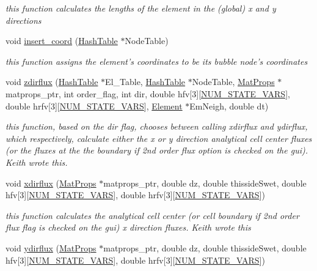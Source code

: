 \begin{CompactItemize}
\begin{CompactList}\small\item\em this function calculates the lengths of the element in the (global) x and y directions \item\end{CompactList}\item 
void \hyperlink{classElement_a74}{insert\_\-coord} (\hyperlink{classHashTable}{Hash\-Table} $\ast$Node\-Table)
\begin{CompactList}\small\item\em this function assigns the element's coordinates to be its bubble node's coordinates \item\end{CompactList}\item 
void \hyperlink{classElement_a75}{zdirflux} (\hyperlink{classHashTable}{Hash\-Table} $\ast$El\_\-Table, \hyperlink{classHashTable}{Hash\-Table} $\ast$Node\-Table, \hyperlink{structMatProps}{Mat\-Props} $\ast$matprops\_\-ptr, int order\_\-flag, int dir, double hfv\mbox{[}3\mbox{]}\mbox{[}\hyperlink{constant_8h_a45}{NUM\_\-STATE\_\-VARS}\mbox{]}, double hrfv\mbox{[}3\mbox{]}\mbox{[}\hyperlink{constant_8h_a45}{NUM\_\-STATE\_\-VARS}\mbox{]}, \hyperlink{classElement}{Element} $\ast$Em\-Neigh, double dt)
\begin{CompactList}\small\item\em this function, based on the dir flag, chooses between calling xdirflux and ydirflux, which respectively, calculate either the x or y direction analytical cell center fluxes (or the fluxes at the the boundary if 2nd order flux option is checked on the gui). Keith wrote this. \item\end{CompactList}\item 
void \hyperlink{classElement_a76}{xdirflux} (\hyperlink{structMatProps}{Mat\-Props} $\ast$matprops\_\-ptr, double dz, double thisside\-Swet, double hfv\mbox{[}3\mbox{]}\mbox{[}\hyperlink{constant_8h_a45}{NUM\_\-STATE\_\-VARS}\mbox{]}, double hrfv\mbox{[}3\mbox{]}\mbox{[}\hyperlink{constant_8h_a45}{NUM\_\-STATE\_\-VARS}\mbox{]})
\begin{CompactList}\small\item\em this function calculates the analytical cell center (or cell boundary if 2nd order flux flag is checked on the gui) x direction fluxes. Keith wrote this \item\end{CompactList}\item 
void \hyperlink{classElement_a77}{ydirflux} (\hyperlink{structMatProps}{Mat\-Props} $\ast$matprops\_\-ptr, double dz, double thisside\-Swet, double hfv\mbox{[}3\mbox{]}\mbox{[}\hyperlink{constant_8h_a45}{NUM\_\-STATE\_\-VARS}\mbox{]}, double hrfv\mbox{[}3\mbox{]}\mbox{[}\hyperlink{constant_8h_a45}{NUM\_\-STATE\_\-VARS}\mbox{]})

\end{CompactItemize}

